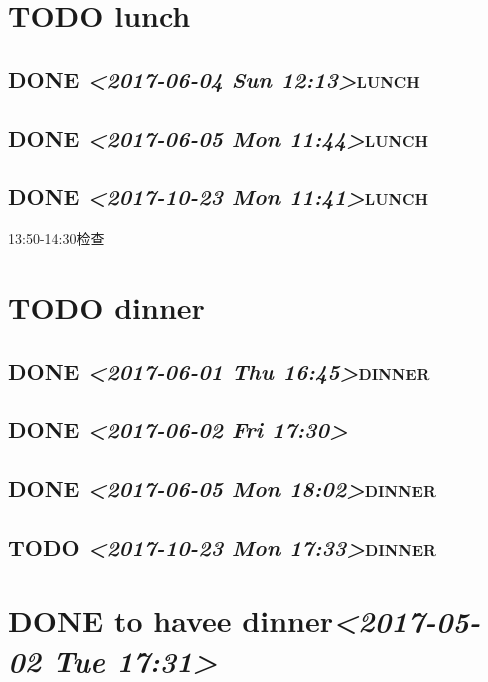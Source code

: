 \documentclass[cyan]{elegantnote}
\begin{document}
\section{{\bfseries\sffamily TODO} lunch}
\label{sec:orgb0078ef}
\subsection{{\bfseries\sffamily DONE} \textit{<2017-06-04 Sun 12:13>}\hfill{}\textsc{lunch}}
\label{sec:orgcae51f6}
\subsection{{\bfseries\sffamily DONE} \textit{<2017-06-05 Mon 11:44>}\hfill{}\textsc{lunch}}
\label{sec:orgdcf7b26}
\subsection{{\bfseries\sffamily DONE} \textit{<2017-10-23 Mon 11:41>}\hfill{}\textsc{lunch}}
\label{sec:orgab111a7}
13:50-14:30检查

\section{{\bfseries\sffamily TODO} dinner}
\label{sec:org6da7f38}
\subsection{{\bfseries\sffamily DONE} \textit{<2017-06-01 Thu 16:45>}\hfill{}\textsc{dinner}}
\label{sec:org0348b13}
\subsection{{\bfseries\sffamily DONE} \textit{<2017-06-02 Fri 17:30>}}
\label{sec:org757a5a0}
\subsection{{\bfseries\sffamily DONE} \textit{<2017-06-05 Mon 18:02>}\hfill{}\textsc{dinner}}
\label{sec:orgc504717}
\subsection{{\bfseries\sffamily TODO} \textit{<2017-10-23 Mon 17:33>}\hfill{}\textsc{dinner}}
\label{sec:org318128b}
\section{{\bfseries\sffamily DONE} to havee dinner\textit{<2017-05-02 Tue 17:31>}}
\label{sec:orgecf9aba}
\end{document}
